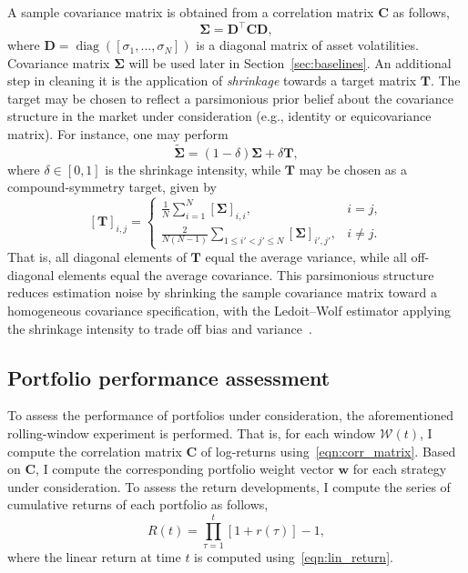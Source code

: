 \documentclass[pdflatex,sn-basic]{sn-jnl}%
\theoremstyle{thmstyleone}%
\theoremstyle{thmstyletwo}%
\theoremstyle{thmstylethree}%
\newcommand{\bw}{\boldsymbol{w}}
\newcommand{\bT}{\boldsymbol{T}}
\newcommand{\bC}{\boldsymbol{C}}
\newcommand{\bD}{\boldsymbol{D}}
\newcommand{\bSigma}{\boldsymbol{\Sigma}}
\newcommand{\calW}{\mathcal{W}}
\DeclareMathOperator{\diag}{diag}
\newcommand{\brc}[1]{\left( #1 \right)}
\newcommand{\sqbrc}[1]{\left[ #1 \right]}
\begin{document}
A sample covariance matrix is obtained from a correlation matrix $\bC$ as follows,
\begin{equation}
\label{eqn:cov_corr}
    \bSigma=\bD^{\top}\bC\bD,
\end{equation}
where $\bD = \diag\brc{[\sigma_1, \ldots, \sigma_N]}$ is a diagonal matrix of asset volatilities. 
Covariance matrix $\bSigma$ will be used later in Section~\ref{sec:baselines}. 
An additional step in cleaning it is the application of \emph{shrinkage} \citep{ledoit2004well} towards a target matrix $\bT$. The target may be chosen to reflect a parsimonious prior belief about the covariance structure in the market under consideration (e.g., identity or equicovariance matrix). For instance, one may perform
\begin{equation}
\label{eqn:shrinkage}
    \tilde{\bSigma} = (1-\delta) \bSigma + \delta \bT,
\end{equation}
where $\delta\in\sqbrc{0,1}$ is the shrinkage intensity, while $\bT$ may be chosen as a compound-symmetry target, given by
\begin{equation}
\label{eqn:const_cov_target}
    \sqbrc{\bT}_{i,j}=
\begin{cases}
\frac{1}{N}\sum_{i=1}^{N}\sqbrc{\bSigma}_{i,i}, & i=j,\\
\frac{2}{N(N-1)}\sum_{1\le i'<j'\le N}\sqbrc{\bSigma}_{i',j'},     & i\neq j.
\end{cases}
\end{equation}
That is, all diagonal elements of $\bT$ equal the average variance, while all off-diagonal elements equal the average covariance. This parsimonious structure reduces estimation noise by shrinking the sample covariance matrix toward a homogeneous covariance specification, with the Ledoit–Wolf estimator applying the shrinkage intensity to trade off bias and variance~\citep{ledoit2004well}.

\subsection{Portfolio performance assessment}
To assess the performance of portfolios under consideration, the aforementioned rolling-window experiment is performed. That is, for each window $\calW(t)$, I compute the correlation matrix $\bC$ of log-returns using~\eqref{eqn:corr_matrix}. Based on $\bC$, I compute the corresponding portfolio weight vector $\bw$ for each strategy under consideration. To assess the return developments, I compute the series of cumulative returns of each portfolio as follows,
\begin{equation}
    R(t) = \prod_{\tau=1}^{t} \sqbrc{1 + r(\tau)} - 1,
\end{equation}
where the linear return at time $t$ is computed using~\eqref{eqn:lin_return}.
\end{document}
